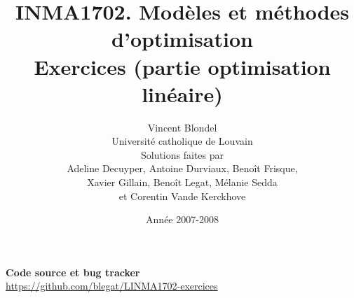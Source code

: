 \documentclass[11pt]{article}
\author{Vincent Blondel\\
Université catholique de Louvain\\
Solutions faites par\\
Adeline Decuyper, Antoine Durviaux, Benoît Frisque,\\
Xavier Gillain, Benoît Legat, Mélanie Sedda\\
et Corentin Vande Kerckhove}
\title{INMA1702. Mod\`eles et m\'ethodes d'optimisation
  \\
Exercices (partie optimisation linéaire)}
\begin{document}
\date{Année 2007-2008}

\maketitle

\begin{center}
\textbf{Code source et bug tracker}\\
\url{https://github.com/blegat/LINMA1702-exercices}
\end{center}

\newpage


\tableofcontents

\newpage




\newpage




\newpage




\newpage




\newpage




\newpage




\newpage



\end{document}
